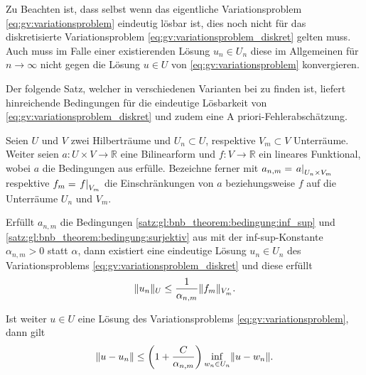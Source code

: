 Zu Beachten ist, dass selbst wenn das eigentliche Variationsproblem \eqref{eq:gv:variationsproblem} eindeutig lösbar ist, dies noch nicht für das diskretisierte Variationsproblem \eqref{eq:gv:variationsproblem_diskret} gelten muss.
Auch muss im Falle einer existierenden Lösung $u_{n} \in U_{n}$ diese im Allgemeinen für $n \to \infty$ nicht gegen die Lösung $u \in U$ von \eqref{eq:gv:variationsproblem} konvergieren.

Der folgende Satz, welcher in verschiedenen Varianten bei \cites[Theorem 6.2.1]{Aziz:2014wf}[Theorem 5.3.1]{Quarteroni:2009hp}[Lemma III.3.7]{Braess:2007wm} zu finden ist, liefert hinreichende Bedingungen für die eindeutige Lösbarkeit von \eqref{eq:gv:variationsproblem_diskret} und zudem eine A priori-Fehlerabschätzung.

\begin{Satz}
    Seien $U$ und $V$ zwei Hilberträume und $U_{n} \subset U$, respektive $V_{m} \subset V$ Unterräume.
    Weiter seien $a \colon U \times V \to \mathbb{R}$ eine Bilinearform und $f \colon V \to \mathbb{R}$ ein lineares Funktional, wobei $a$ die Bedingungen aus  erfülle.
    Bezeichne ferner mit $a_{n, m} = \left.a\right|_{U_{n} \times V_{m}}$ respektive $f_{m} = \left.f\right|_{V_{m}}$ die Einschränkungen von $a$ beziehungsweise $f$ auf die Unterräume $U_{n}$ und $V_{m}$.

    Erfüllt $a_{n, m}$ die Bedingungen \ref{satz:gl:bnb_theorem:bedingung:inf_sup} und \ref{satz:gl:bnb_theorem:bedingung:surjektiv} aus  mit der inf-sup-Konstante $\alpha_{n, m} > 0$ statt $\alpha$, dann existiert eine eindeutige Lösung $u_{n} \in U_{n}$ des Variationsproblems \eqref{eq:gv:variationsproblem_diskret} und diese erfüllt
    \begin{equation}
        \lVert u_{n}\rVert_{U} \leq \frac{1}{\alpha_{n, m}} \lVert f_{m}\rVert_{V_m'}.
    \end{equation}

    Ist weiter $u \in U$ eine Lösung des Variationsproblems \eqref{eq:gv:variationsproblem}, dann gilt
    \begin{equation}
        \lVert u - u_{n}\rVert \leq \left( 1 + \frac{C}{\alpha_{n, m}} \right)  \inf_{w_{n} \in U_{n}} \lVert u - w_{n}\rVert.
    \end{equation}

    \begin{Beweis}$\;$
    \end{Beweis}
\end{Satz}

